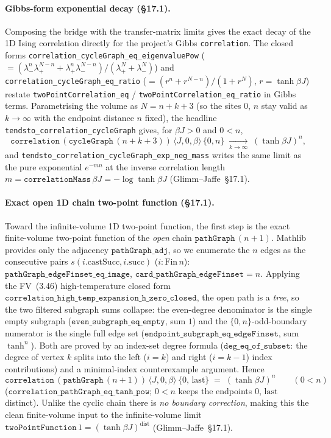 \documentclass[a4paper,11pt]{article}
\begin{document}
\paragraph{Gibbs-form exponential decay (\S17.1).}
Composing the bridge with the transfer-matrix limits gives the exact decay of the
1D Ising correlation directly for the project's Gibbs \texttt{correlation}.  The
closed forms \texttt{correlation\_cycleGraph\_eq\_eigenvaluePow}
($= (\lambda_-^n\lambda_+^{N-n}+\lambda_+^n\lambda_-^{N-n})/(\lambda_+^N+\lambda_-^N)$)
and \texttt{correlation\_cycleGraph\_eq\_ratio}
($= (r^n+r^{N-n})/(1+r^N)$, $r = \tanh\beta J$) restate
\texttt{twoPointCorrelation\_eq} / \texttt{twoPointCorrelation\_eq\_ratio} in Gibbs
terms.  Parametrising the volume as $N = n+k+3$ (so the sites $0$, $n$ stay valid as
$k\to\infty$ with the endpoint distance $n$ fixed), the headline
\texttt{tendsto\_correlation\_cycleGraph} gives, for $\beta J > 0$ and $0 < n$,
\[
  \texttt{correlation}\,(\texttt{cycleGraph}\,(n{+}k{+}3))\,\langle J,0,\beta\rangle\,\{0,n\}
  \;\xrightarrow[k\to\infty]{}\; (\tanh\beta J)^n,
\]
and \texttt{tendsto\_correlation\_cycleGraph\_exp\_neg\_mass} writes the same limit as
the pure exponential $e^{-m n}$ at the inverse correlation length
$m = \texttt{correlationMass}\,\beta J = -\log\tanh\beta J$ (Glimm--Jaffe~\S17.1).

\paragraph{Exact open 1D chain two-point function (\S17.1).}
Toward the infinite-volume 1D two-point function, the first step is the exact
finite-volume two-point function of the \emph{open} chain $\texttt{pathGraph}\,(n{+}1)$.
Mathlib provides only the adjacency $\texttt{pathGraph\_adj}$, so we enumerate the
$n$ edges as the consecutive pairs $s(i.\mathrm{castSucc}, i.\mathrm{succ})$
($i:\mathrm{Fin}\,n$): $\texttt{pathGraph\_edgeFinset\_eq\_image}$,
$\texttt{card\_pathGraph\_edgeFinset} = n$.  Applying the FV~(3.46) high-temperature
closed form $\texttt{correlation\_high\_temp\_expansion\_h\_zero\_closed}$, the open
path is a \emph{tree}, so the two filtered subgraph sums collapse: the even-degree
denominator is the single empty subgraph ($\texttt{even\_subgraph\_eq\_empty}$, sum
$1$) and the $\{0,n\}$-odd-boundary numerator is the single full edge set
($\texttt{endpoint\_subgraph\_eq\_edgeFinset}$, sum $\tanh^n$).  Both are proved by an
index-set degree formula ($\texttt{deg\_eq\_of\_subset}$: the degree of vertex $k$
splits into the left ($i = k$) and right ($i = k-1$) index contributions) and a
minimal-index counterexample argument.  Hence
\[
  \texttt{correlation}\,(\texttt{pathGraph}\,(n{+}1))\,\langle J,0,\beta\rangle\,
    \{0,\,\mathrm{last}\} \;=\; (\tanh\beta J)^n
  \qquad (0 < n)
\]
($\texttt{correlation\_pathGraph\_eq\_tanh\_pow}$; $0 < n$ keeps the endpoints
$0$, $\mathrm{last}$ distinct).  Unlike the cyclic chain there is
\emph{no boundary correction}, making this the clean finite-volume input to the
infinite-volume limit $\texttt{twoPointFunction}\,1 = (\tanh\beta J)^{\mathrm{dist}}$
(Glimm--Jaffe~\S17.1).
\end{document}

